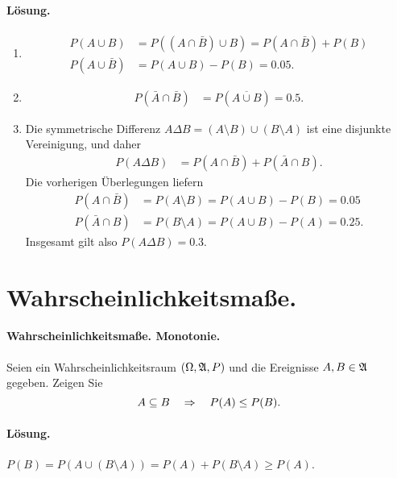 \paragraph*{Lösung.}
\begin{enumerate}
    \item \begin{align*}
            P(A \cup B) &= P( (A \cap \bar B) \cup B ) = 
            P( A \cap \bar B  ) + P(B) \\
            P(A \cup \bar B) &= P(A \cup B) - P(B) = 0.05.
        \end{align*}
    \item \begin{align*}
            P(\bar A \cap \bar B) &= P(\overline{A \cup B}) = 0.5.
        \end{align*}
    \item Die symmetrische Differenz $A \Delta B = (A \setminus B) \cup (B \setminus A)$
        ist eine disjunkte Vereinigung, und daher
        \begin{align*}
            P(A \Delta B) &= P(A \cap \bar B) + P(\bar A \cap B).
        \end{align*}
        Die vorherigen Überlegungen liefern
        \begin{align*}
            P( A \cap \bar B) &= P(A \setminus B) = P(A \cup B) - P(B) = 0.05 \\
            P( \bar A \cap B) &= P(B \setminus A) = P(A \cup B) - P(A) = 0.25.
        \end{align*}
        Insgesamt gilt also $P(A \Delta B) = 0.3$.
\end{enumerate}


\section{Wahrscheinlichkeitsmaße.}

\paragraph{Wahrscheinlichkeitsmaße. Monotonie.} Seien ein Wahrscheinlichkeitsraum \linebreak
$(\Omega, \mathfrak A, P)$ und die Ereignisse $A,B \in \mathfrak A$ gegeben. Zeigen Sie
\begin{equation*}
A \subseteq B \quad  \Rightarrow \quad P(A) \leq P(B).
\end{equation*}

\paragraph*{Lösung.} $P(B) = P(A \cup (B \setminus A))= P(A) + P(B\setminus A) \geq P(A)$. 


